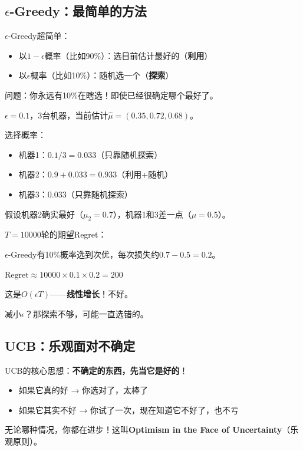 \documentclass[11pt,a4paper]{article}
\theoremstyle{definition}
\begin{document}
\subsection{$\epsilon$-Greedy：最简单的方法}

\begin{plainwords}
$\epsilon$-Greedy超简单：

\begin{itemize}
    \item 以$1-\epsilon$概率（比如90\%）：选目前估计最好的（\textbf{利用}）
    \item 以$\epsilon$概率（比如10\%）：随机选一个（\textbf{探索}）
\end{itemize}

问题：你永远有10\%在瞎选！即使已经很确定哪个最好了。
\end{plainwords}

\begin{calculation}
$\epsilon = 0.1$，3台机器，当前估计$\hat{\mu} = (0.35, 0.72, 0.68)$。

选择概率：
\begin{itemize}
    \item 机器1：$0.1 / 3 = 0.033$（只靠随机探索）
    \item 机器2：$0.9 + 0.033 = 0.933$（利用+随机）
    \item 机器3：$0.033$（只靠随机探索）
\end{itemize}

假设机器2确实最好（$\mu_2 = 0.7$），机器1和3差一点（$\mu = 0.5$）。

$T = 10000$轮的期望Regret：

$\epsilon$-Greedy有10\%概率选到次优，每次损失约$0.7 - 0.5 = 0.2$。

$\text{Regret} \approx 10000 \times 0.1 \times 0.2 = 200$

这是$O(\epsilon T)$——\textbf{线性增长}！不好。

减小$\epsilon$？那探索不够，可能一直选错的。
\end{calculation}

\subsection{UCB：乐观面对不确定}

\begin{plainwords}
UCB的核心思想：\textbf{不确定的东西，先当它是好的}！

\begin{itemize}
    \item 如果它真的好 → 你选对了，太棒了
    \item 如果它其实不好 → 你试了一次，现在知道它不好了，也不亏
\end{itemize}

无论哪种情况，你都在进步！这叫\textbf{Optimism in the Face of Uncertainty}（乐观原则）。
\end{plainwords}
\end{document}
